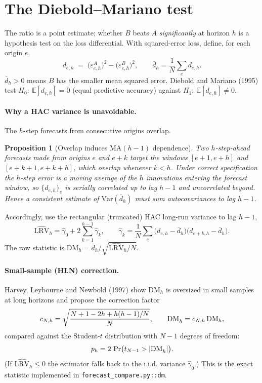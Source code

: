 \documentclass[11pt]{article}
\newtheorem{proposition}{Proposition}
\begin{document}
\section{The Diebold--Mariano test}

The ratio is a point estimate; whether $B$ beats $A$ \emph{significantly} at
horizon $h$ is a hypothesis test on the loss differential. With squared-error loss,
define, for each origin $e$,
\[
d_{e,h} \;=\; \big(\varepsilon^{A}_{e,h}\big)^2 - \big(\varepsilon^{B}_{e,h}\big)^2,
\qquad
\bar d_h=\frac1N\sum_e d_{e,h}.
\]
$\bar d_h>0$ means $B$ has the smaller mean squared error. Diebold and Mariano
(1995) test $H_0:\ \mathbb E[d_{e,h}]=0$ (equal predictive accuracy) against
$H_1:\ \mathbb E[d_{e,h}]\neq 0$.

\paragraph{Why a HAC variance is unavoidable.}
The $h$-step forecasts from consecutive origins overlap.

\begin{proposition}[Overlap induces $\mathrm{MA}(h-1)$ dependence]
Two $h$-step-ahead forecasts made from origins $e$ and $e+k$ target the windows
$[e+1,e+h]$ and $[e+k+1,e+k+h]$, which \emph{overlap} whenever $k<h$. Under
correct specification the $h$-step error is a moving average of the $h$ innovations
entering the forecast window, so $\{d_{e,h}\}_e$ is serially correlated up to lag
$h-1$ and uncorrelated beyond. Hence a consistent estimate of
$\mathrm{Var}(\bar d_h)$ must sum autocovariances to lag $h-1$.
\end{proposition}

Accordingly, use the rectangular (truncated) HAC long-run variance to lag $h-1$,
\[
\widehat{\mathrm{LRV}}_h
=\hat\gamma_0+2\sum_{k=1}^{h-1}\hat\gamma_k,
\qquad
\hat\gamma_k=\frac1N\sum_{e}\big(d_{e,h}-\bar d_h\big)\big(d_{e+k,h}-\bar d_h\big).
\]
The raw statistic is $\mathrm{DM}_h=\bar d_h\big/\sqrt{\widehat{\mathrm{LRV}}_h/N}$.

\paragraph{Small-sample (HLN) correction.}
Harvey, Leybourne and Newbold (1997) show $\mathrm{DM}_h$ is oversized in small
samples at long horizons and propose the correction factor
\[
c_{N,h}=\sqrt{\frac{N+1-2h+h(h-1)/N}{N}},
\qquad
\mathrm{DM}^{\*}_h=c_{N,h}\,\mathrm{DM}_h,
\]
compared against the Student-$t$ distribution with $N-1$ degrees of freedom:
\[
p_h = 2\,\Pr\!\big(t_{N-1} > |\mathrm{DM}^{\*}_h|\big).
\]
(If $\widehat{\mathrm{LRV}}_h\le 0$ the estimator falls back to the i.i.d.
variance $\hat\gamma_0$.) This is the exact statistic implemented in
\texttt{forecast\_compare.py::dm}.
\end{document}
